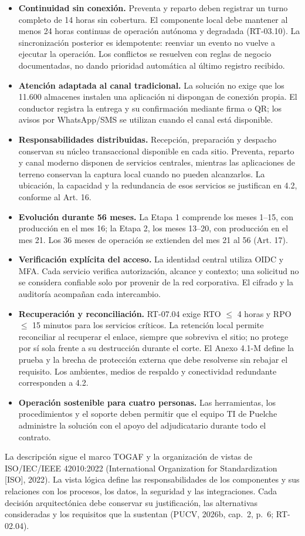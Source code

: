 \begin{itemize}
  \item \textbf{Continuidad sin conexión.} Preventa y reparto deben registrar un turno completo de 14 horas sin cobertura. El componente local debe mantener al menos 24 horas continuas de operación autónoma y degradada (RT-03.10). La sincronización posterior es idempotente: reenviar un evento no vuelve a ejecutar la operación. Los conflictos se resuelven con reglas de negocio documentadas, no dando prioridad automática al último registro recibido.
  \item \textbf{Atención adaptada al canal tradicional.} La solución no exige que los 11.600 almacenes instalen una aplicación ni dispongan de conexión propia. El conductor registra la entrega y su confirmación mediante firma o QR; los avisos por WhatsApp/SMS se utilizan cuando el canal está disponible.
  \item \textbf{Responsabilidades distribuidas.} Recepción, preparación y despacho conservan su núcleo transaccional disponible en cada sitio. Preventa, reparto y canal moderno disponen de servicios centrales, mientras las aplicaciones de terreno conservan la captura local cuando no pueden alcanzarlos. La ubicación, la capacidad y la redundancia de esos servicios se justifican en 4.2, conforme al Art. 16.
  \item \textbf{Evolución durante 56 meses.} La Etapa 1 comprende los meses 1--15, con producción en el mes 16; la Etapa 2, los meses 13--20, con producción en el mes 21. Los 36 meses de operación se extienden del mes 21 al 56 (Art. 17).
  \item \textbf{Verificación explícita del acceso.} La identidad central utiliza OIDC y MFA. Cada servicio verifica autorización, alcance y contexto; una solicitud no se considera confiable solo por provenir de la red corporativa. El cifrado y la auditoría acompañan cada intercambio.
  \item \textbf{Recuperación y reconciliación.} RT-07.04 exige RTO $\leq$ 4 horas y RPO $\leq$ 15 minutos para los servicios críticos. La retención local permite reconciliar al recuperar el enlace, siempre que sobreviva el sitio; no protege por sí sola frente a su destrucción durante el corte. El Anexo 4.1-M define la prueba y la brecha de protección externa que debe resolverse sin rebajar el requisito. Los ambientes, medios de respaldo y conectividad redundante corresponden a 4.2.
  \item \textbf{Operación sostenible para cuatro personas.} Las herramientas, los procedimientos y el soporte deben permitir que el equipo TI de Puelche administre la solución con el apoyo del adjudicatario durante todo el contrato.
\end{itemize}

La descripción sigue el marco TOGAF y la organización de vistas de ISO/IEC/IEEE 42010:2022 (International Organization for Standardization [ISO], 2022). La vista lógica define las responsabilidades de los componentes y sus relaciones con los procesos, los datos, la seguridad y las integraciones. Cada decisión arquitectónica debe conservar su justificación, las alternativas consideradas y los requisitos que la sustentan (PUCV, 2026b, cap.~2, p.~6; RT-02.04).

